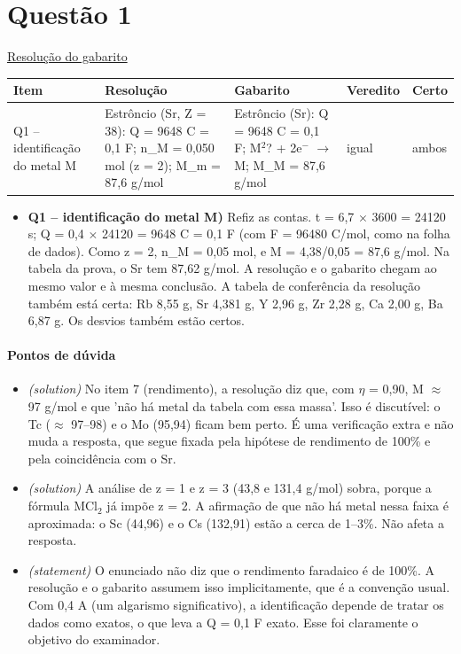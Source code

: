 \documentclass{article}%
\begin{document}
\section*{Questão 1}%
\href{https://poliedroresolve.sistemapoliedro.com.br/vestibulares/ime/2026/ime-2-fase-dia-3-25-10-2025-2-fase-dia-3/dissertativa-1-quimica-2-fase-dia-3-ime-2026}{Resolução do gabarito}\par\smallskip%
\begin{longtable}{@{}p{} p{} p{} p{} p{}@{}}\toprule Item & Resolução & Gabarito & Veredito & Certo \\ \midrule
Q1 -- identificação do metal M & Estrôncio (Sr, Z = 38): Q = 9648 C = 0,1 F; n\_M = 0,050 mol (z = 2); M\_m = 87,6 g/mol & Estrôncio (Sr): Q = 9648 C = 0,1 F; M$^2$? + 2e$^{-}$ $\to$ M; M\_M = 87,6 g/mol & igual & ambos \\
\bottomrule\end{longtable}%
\begin{itemize}%
\item%
\textbf{Q1 -- identificação do metal M)} Refiz as contas. t = 6,7 $\times$ 3600 = 24120 s; Q = 0,4 $\times$ 24120 = 9648 C = 0,1 F (com F = 96480 C/mol, como na folha de dados). Como z = 2, n\_M = 0,05 mol, e M = 4,38/0,05 = 87,6 g/mol. Na tabela da prova, o Sr tem 87,62 g/mol. A resolução e o gabarito chegam ao mesmo valor e à mesma conclusão. A tabela de conferência da resolução também está certa: Rb 8,55 g, Sr 4,381 g, Y 2,96 g, Zr 2,28 g, Ca 2,00 g, Ba 6,87 g. Os desvios também estão certos.%
\end{itemize}%
\paragraph{Pontos de dúvida}%
\begin{itemize}%
\item%
\textit{(solution)} No item 7 (rendimento), a resolução diz que, com $\eta$ = 0,90, M $\approx$ 97 g/mol e que 'não há metal da tabela com essa massa'. Isso é discutível: o Tc ($\approx$ 97--98) e o Mo (95,94) ficam bem perto. É uma verificação extra e não muda a resposta, que segue fixada pela hipótese de rendimento de 100\% e pela coincidência com o Sr.%
\item%
\textit{(solution)} A análise de z = 1 e z = 3 (43,8 e 131,4 g/mol) sobra, porque a fórmula MCl$_{2}$ já impõe z = 2. A afirmação de que não há metal nessa faixa é aproximada: o Sc (44,96) e o Cs (132,91) estão a cerca de 1--3\%. Não afeta a resposta.%
\item%
\textit{(statement)} O enunciado não diz que o rendimento faradaico é de 100\%. A resolução e o gabarito assumem isso implicitamente, que é a convenção usual. Com 0,4 A (um algarismo significativo), a identificação depende de tratar os dados como exatos, o que leva a Q = 0,1 F exato. Esse foi claramente o objetivo do examinador.%
\end{itemize}%
\end{document}
